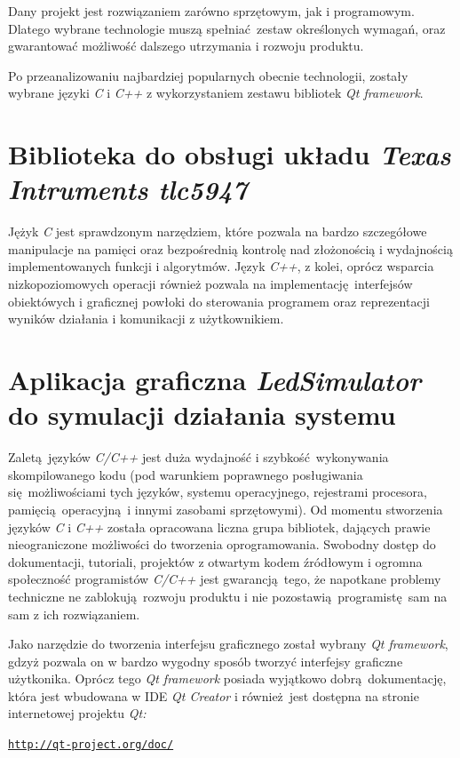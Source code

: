 \documentclass[eng,printmode]{mgr}
\begin{document}
Dany projekt jest rozwiązaniem zarówno sprzętowym, jak i programowym. Dlatego wybrane technologie muszą spełniać zestaw określonych wymagań, oraz gwarantować możliwość dalszego utrzymania i rozwoju produktu.

Po przeanalizowaniu najbardziej popularnych obecnie technologii, zostały wybrane języki \emph{C} i \emph{C++} z wykorzystaniem zestawu bibliotek \emph{Qt framework}.

\section{Biblioteka do obsługi układu \emph{Texas Intruments tlc5947}}
Jężyk \emph{C} jest sprawdzonym narzędziem, które pozwala na bardzo szczegółowe manipulacje na pamięci oraz bezpośrednią kontrolę nad złożonością i wydajnością implementowanych funkcji i algorytmów. Język \emph{C++}, z kolei, oprócz wsparcia nizkopoziomowych operacji również pozwala na implementację interfejsów obiektówych i graficznej powłoki do sterowania programem oraz reprezentacji wyników działania i komunikacji z użytkownikiem.


\section{Aplikacja graficzna \emph{LedSimulator} do symulacji działania systemu}
Zaletą języków \emph{C/C++} jest duża wydajność i szybkość wykonywania skompilowanego kodu (pod warunkiem poprawnego posługiwania się możliwościami tych języków, systemu operacyjnego, rejestrami procesora, pamięcią operacyjną i innymi zasobami sprzętowymi). Od momentu stworzenia języków \emph{C} i \emph{C++} została opracowana liczna grupa bibliotek, dających prawie nieograniczone możliwości do tworzenia oprogramowania. Swobodny dostęp do dokumentacji, tutoriali, projektów z otwartym kodem źródłowym i ogromna społeczność programistów \emph{C/C++} jest gwarancją tego, że napotkane problemy techniczne ne zablokują rozwoju produktu i nie pozostawią programistę sam na sam z ich rozwiązaniem.

Jako narzędzie do tworzenia interfejsu graficznego został wybrany \emph{Qt framework}, gdzyż pozwala on w bardzo wygodny sposób tworzyć interfejsy graficzne użytkonika. Oprócz tego \emph{Qt framework} posiada wyjątkowo dobrą dokumentację, która jest wbudowana w IDE \emph{Qt Creator} i również jest dostępna na stronie internetowej projektu \emph{Qt:} 

\begin{alltt}
    \url{http://qt-project.org/doc/}
\end{alltt}
\end{document}
